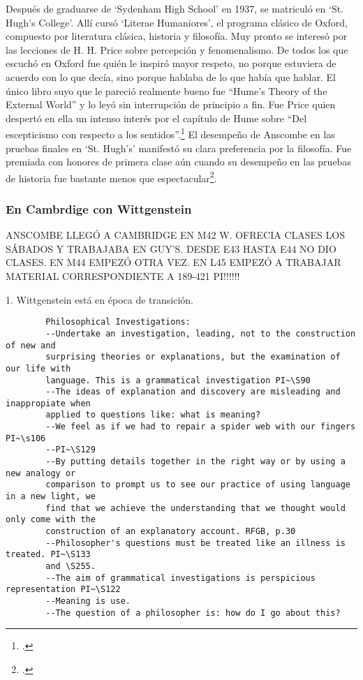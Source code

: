         Después de graduarse de `Sydenham High School' en 1937, se matriculó en `St.
        Hugh's College'. Allí cursó `Literae Humaniores', el programa clásico de Oxford,
        compuesto por literatura clásica, historia y filosofía. Muy pronto se interesó
        por las lecciones de H. H. Price sobre percepción y fenomenalismo. De todos los
        que escuchó en Oxford fue quién le inspiró mayor respeto, no porque estuviera de
        acuerdo con lo que decía, sino porque hablaba de lo que había que hablar. El
        único libro suyo que le pareció realmente bueno fue ``Hume's Theory of the
        External World'' y lo leyó sin interrupción de principio a
        fin. Fue Price quien despertó en ella un intenso interés por el capítulo de Hume
        sobre ``Del escepticismo con respecto a los sentidos''.\footcite[cf.~][p.~viii
        \S1]{M&PotM} El desempeño de Anscombe en las pruebas finales en `St. Hugh's'
        manifestó su clara preferencia por la filosofía. Fue premiada con honores de
        primera clase aún cuando su desempeño en las pruebas de historia fue bastante
        menos que espectacular\footcite[p.~3~\S1]{teichmann}.

        \subsubsection{En Cambrdige con Wittgenstein}
        ANSCOMBE LLEGÓ A CAMBRIDGE EN M42 W. OFRECIA CLASES LOS SÁBADOS Y TRABAJABA EN
        GUY'S. DESDE E43 HASTA E44 NO DIO CLASES. EN M44 EMPEZÓ OTRA VEZ. EN L45 EMPEZÓ
        A TRABAJAR MATERIAL CORRESPONDIENTE A 189-421 PI!!!!!!

        1. Wittgenstein está en época de transición.
        \begin{verbatim}
        Philosophical Investigations:
        --Undertake an investigation, leading, not to the construction of new and
        surprising theories or explanations, but the examination of our life with
        language. This is a grammatical investigation PI~\S90 
        --The ideas of explanation and discovery are misleading and inappropiate when
        applied to questions like: what is meaning?
        --We feel as if we had to repair a spider web with our fingers PI~\s106
        --PI~\S129
        --By putting details together in the right way or by using a new analogy or
        comparison to prompt us to see our practice of using language in a new light, we
        find that we achieve the understanding that we thought would only come with the
        construction of an explanatory account. RFGB, p.30
        --Philosopher's questions must be treated like an illness is treated. PI~\S133
        and \S255.
        --The aim of grammatical investigations is perspicious representation PI~\S122
        --Meaning is use.
        --The question of a philosopher is: how do I go about this?
        \end{verbatim}


